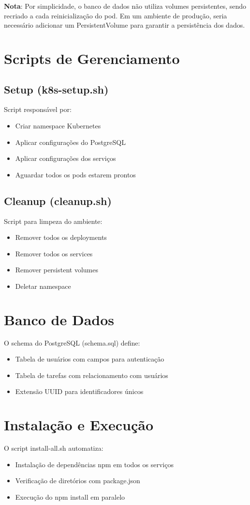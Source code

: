 \documentclass{article}
\begin{document}
\textbf{Nota}: Por simplicidade, o banco de dados não utiliza volumes persistentes, sendo recriado a cada reinicialização do pod. Em um ambiente de produção, seria necessário adicionar um PersistentVolume para garantir a persistência dos dados.

\section{Scripts de Gerenciamento}
\subsection{Setup (k8s-setup.sh)}
Script responsável por:
\begin{itemize}
    \item Criar namespace Kubernetes
    \item Aplicar configurações do PostgreSQL
    \item Aplicar configurações dos serviços
    \item Aguardar todos os pods estarem prontos
\end{itemize}

\subsection{Cleanup (cleanup.sh)}
Script para limpeza do ambiente:
\begin{itemize}
    \item Remover todos os deployments
    \item Remover todos os services
    \item Remover persistent volumes
    \item Deletar namespace
\end{itemize}

\section{Banco de Dados}
O schema do PostgreSQL (schema.sql) define:
\begin{itemize}
    \item Tabela de usuários com campos para autenticação
    \item Tabela de tarefas com relacionamento com usuários
    \item Extensão UUID para identificadores únicos
\end{itemize}

\section{Instalação e Execução}
O script install-all.sh automatiza:
\begin{itemize}
    \item Instalação de dependências npm em todos os serviços
    \item Verificação de diretórios com package.json
    \item Execução do npm install em paralelo
\end{itemize}
\end{document}
